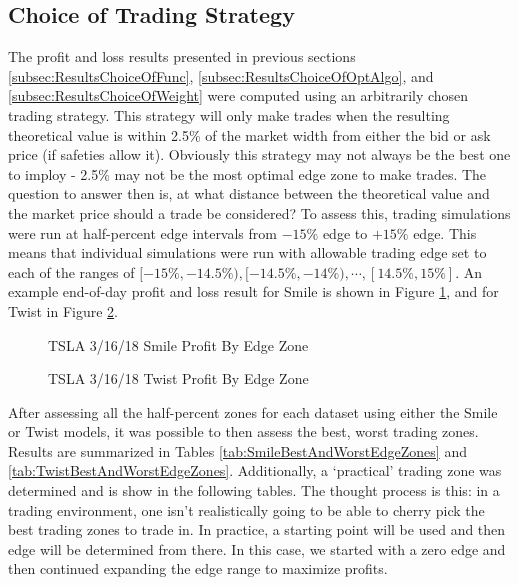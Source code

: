 \documentclass[12pt, a4paper, notitlepage]{article}
\numberwithin{equation}{subsection}
\numberwithin{figure}{subsection}
\numberwithin{table}{subsection}
\newcommand{\img}[3]
{
    \begin{figure}[H]
	\caption{#1}
	\centerline{\fbox{\texttt{[image: \#2]}}}
	\label{#3}
    \end{figure}
}
\newcommand{\newpar}{\newline \newline}
\begin{document}
\subsection{Choice of Trading Strategy} \label{subsec:ResultsChoiceOfTradingStrategy}
The profit and loss results presented in previous sections \ref{subsec:ResultsChoiceOfFunc}, \ref{subsec:ResultsChoiceOfOptAlgo}, and \ref{subsec:ResultsChoiceOfWeight} were computed using an arbitrarily chosen trading strategy.  This strategy will only make trades when the resulting theoretical value is within 2.5\% of the market width from either the bid or ask price (if safeties allow it).
\newpar
Obviously this strategy may not always be the best one to imploy - 2.5\% may not be the most optimal edge zone to make trades.  The question to answer then is, at what distance between the theoretical value and the market price should a trade be considered?  To assess this, trading simulations were run at half-percent edge intervals from $-15\%$ edge to $+15\%$ edge.  This means that individual simulations were run with allowable trading edge set to each of the ranges of $[-15\%,-14.5\%), [-14.5\%,-14\%), \cdots , [14.5\%,15\%]$.  An example end-of-day profit and loss result for Smile is shown in Figure \ref{fig:TSLA_Mar_Smile_ZonePnL}, and for Twist in Figure \ref{fig:TSLA_Mar_Twist_ZonePnL}.

\img{TSLA 3/16/18 Smile Profit By Edge Zone}{TSLA_Mar_Smile_ZonePnL}{fig:TSLA_Mar_Smile_ZonePnL}

\img{TSLA 3/16/18 Twist Profit By Edge Zone}{TSLA_Mar_Twist_ZonePnL}{fig:TSLA_Mar_Twist_ZonePnL}

After assessing all the half-percent zones for each dataset using either the Smile or Twist models, it was possible to then assess the best, worst trading zones.  Results are summarized in Tables \ref{tab:SmileBestAndWorstEdgeZones} and \ref{tab:TwistBestAndWorstEdgeZones}.  Additionally, a `practical' trading zone was determined and is show in the following tables.  The thought process is this:  in a trading environment, one isn't realistically going to be able to cherry pick the best trading zones to trade in.  In practice, a starting point will be used and then edge will be determined from there.  In this case, we started with a zero edge and then continued expanding the edge range to maximize profits. 
\end{document}
